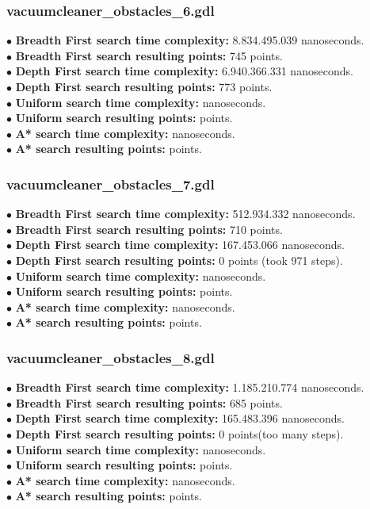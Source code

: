 \documentclass[11pt]{article}
\begin{document}
\subsubsection{vacuumcleaner\_obstacles\_6.gdl}
$\bullet$ {\bf Breadth First search time complexity: } 8.834.495.039 nanoseconds.  \\
$\bullet$ {\bf Breadth First search resulting points: } 745 points. \\
$\bullet$ {\bf Depth First search time complexity: } 6.940.366.331 nanoseconds. \\
$\bullet$ {\bf Depth First search resulting points: } 773 points. \\
$\bullet$ {\bf Uniform search time complexity: } nanoseconds. \\
$\bullet$ {\bf Uniform search resulting points: } points. \\
$\bullet$ {\bf A* search time complexity: } nanoseconds. \\ 
$\bullet$ {\bf A* search resulting points: } points.\\

\subsubsection{vacuumcleaner\_obstacles\_7.gdl}
$\bullet$ {\bf Breadth First search time complexity: } 512.934.332 nanoseconds.\\
$\bullet$ {\bf Breadth First search resulting points: } 710 points. \\
$\bullet$ {\bf Depth First search time complexity: } 167.453.066 nanoseconds. \\
$\bullet$ {\bf Depth First search resulting points: } 0 points (took 971 steps). \\
$\bullet$ {\bf Uniform search time complexity: } nanoseconds. \\
$\bullet$ {\bf Uniform search resulting points: } points. \\
$\bullet$ {\bf A* search time complexity: } nanoseconds. \\ 
$\bullet$ {\bf A* search resulting points: } points.\\

\subsubsection{vacuumcleaner\_obstacles\_8.gdl}
$\bullet$ {\bf Breadth First search time complexity: } 1.185.210.774 nanoseconds.\\
$\bullet$ {\bf Breadth First search resulting points: } 685 points.\\
$\bullet$ {\bf Depth First search time complexity: } 165.483.396 nanoseconds. \\
$\bullet$ {\bf Depth First search resulting points: } 0 points(too many steps). \\
$\bullet$ {\bf Uniform search time complexity: } nanoseconds. \\
$\bullet$ {\bf Uniform search resulting points: } points. \\
$\bullet$ {\bf A* search time complexity: } nanoseconds. \\ 
$\bullet$ {\bf A* search resulting points: } points.\\
\end{document}
